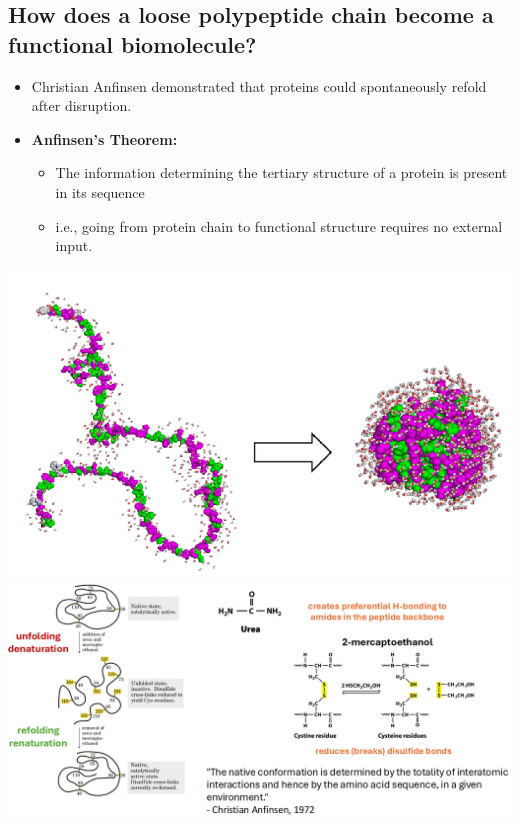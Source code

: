 \documentclass[10pt]{article}
\begin{document}
\subsection*{How does a loose polypeptide chain become a functional biomolecule?}
\begin{itemize}
    \item Christian Anfinsen demonstrated that proteins could spontaneously refold after disruption.
    \item \textbf{Anfinsen's Theorem:}
    \begin{itemize}
        \item The information determining the tertiary structure of a protein is present in its sequence
        \item i.e., going from protein chain to functional structure requires no external input.
    \end{itemize}
\end{itemize}
\begin{center}
    \includegraphics[scale=0.8]{L4_10.png}\\
    \includegraphics[width=\textwidth]{L4_11.png}
\end{center}
\end{document}
